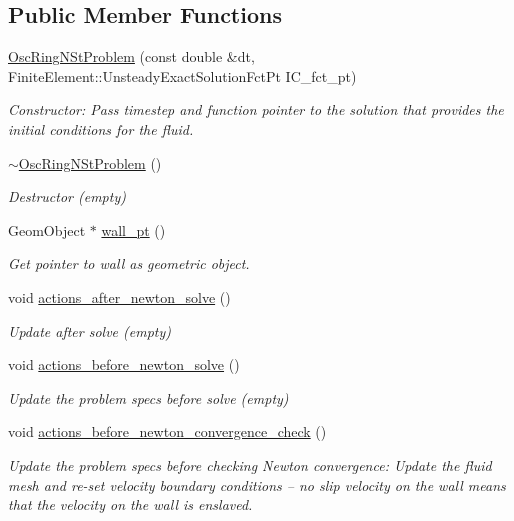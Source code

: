 \subsection*{Public Member Functions}
\begin{DoxyCompactItemize}
\item 
\hyperlink{classOscRingNStProblem_acd5f633c43eb4cfb43c45361ecf85e6b}{Osc\+Ring\+N\+St\+Problem} (const double \&dt, Finite\+Element\+::\+Unsteady\+Exact\+Solution\+Fct\+Pt I\+C\+\_\+fct\+\_\+pt)
\begin{DoxyCompactList}\small\item\em Constructor\+: Pass timestep and function pointer to the solution that provides the initial conditions for the fluid. \end{DoxyCompactList}\item 
\hyperlink{classOscRingNStProblem_a96e43adf75d4e33270218ceb3397443c}{$\sim$\+Osc\+Ring\+N\+St\+Problem} ()
\begin{DoxyCompactList}\small\item\em Destructor (empty) \end{DoxyCompactList}\item 
Geom\+Object $\ast$ \hyperlink{classOscRingNStProblem_a8ef3175a1869d5d2f788c68e1c090538}{wall\+\_\+pt} ()
\begin{DoxyCompactList}\small\item\em Get pointer to wall as geometric object. \end{DoxyCompactList}\item 
void \hyperlink{classOscRingNStProblem_a6e4be6a46ab263941b76ab4e6706f63a}{actions\+\_\+after\+\_\+newton\+\_\+solve} ()
\begin{DoxyCompactList}\small\item\em Update after solve (empty) \end{DoxyCompactList}\item 
void \hyperlink{classOscRingNStProblem_a7d8ff9543c042752b649ed326d6c5915}{actions\+\_\+before\+\_\+newton\+\_\+solve} ()
\begin{DoxyCompactList}\small\item\em Update the problem specs before solve (empty) \end{DoxyCompactList}\item 
void \hyperlink{classOscRingNStProblem_a98d4c847cd9d53ab3569b8418ecb0c6b}{actions\+\_\+before\+\_\+newton\+\_\+convergence\+\_\+check} ()
\begin{DoxyCompactList}\small\item\em Update the problem specs before checking Newton convergence\+: Update the fluid mesh and re-\/set velocity boundary conditions -- no slip velocity on the wall means that the velocity on the wall is enslaved. \end{DoxyCompactList}\item 

\end{DoxyCompactItemize}
